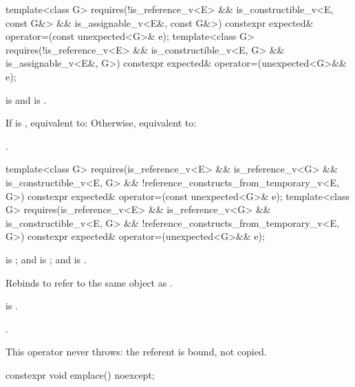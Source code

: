 %
\begin{itemdecl}
template<class G>
  requires(!is_reference_v<E> && is_constructible_v<E, const G&> &&
           is_assignable_v<E&, const G&>)
constexpr expected& operator=(const unexpected<G>& e);
template<class G>
  requires(!is_reference_v<E> && is_constructible_v<E, G> && is_assignable_v<E&, G>)
constexpr expected& operator=(unexpected<G>&& e);
\end{itemdecl}

\begin{itemdescr}
\pnum
\constraints
{} is  and  is .

\pnum
\effects
If  is , equivalent to:  Otherwise, equivalent to: 

\pnum
\returns
{}.
\end{itemdescr}

%
\begin{itemdecl}
template<class G>
  requires(is_reference_v<E> && is_reference_v<G> && is_constructible_v<E, G> &&
           !reference_constructs_from_temporary_v<E, G>)
constexpr expected& operator=(const unexpected<G>& e);
template<class G>
  requires(is_reference_v<E> && is_reference_v<G> && is_constructible_v<E, G> &&
           !reference_constructs_from_temporary_v<E, G>)
constexpr expected& operator=(unexpected<G>&& e);
\end{itemdecl}

\begin{itemdescr}
\pnum
\constraints
{} is ; and  is ; and  is .

\pnum
\effects
Rebinds  to refer to the same object as .

\pnum
\ensures
{} is .

\pnum
\returns
{}.

\pnum
\remarks
This operator never throws: the referent is bound, not copied.
\end{itemdescr}

%
\begin{itemdecl}
constexpr void emplace() noexcept;
\end{itemdecl}

